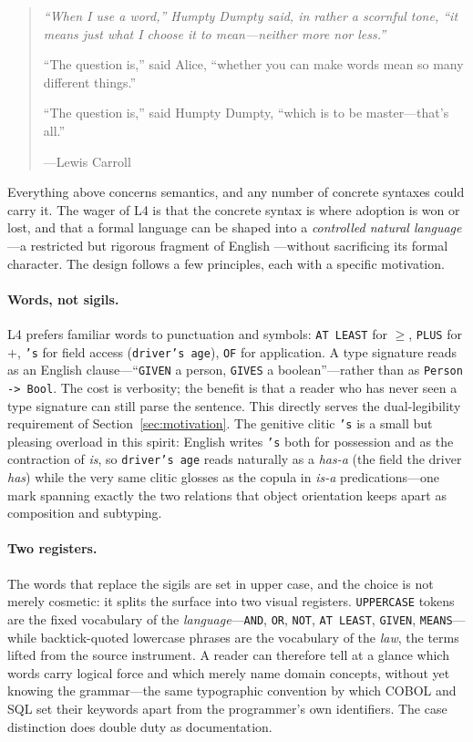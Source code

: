 \documentclass[sigconf,nonacm]{acmart}
\newcommand{\bq}{\char96\relax}            %
\newcommand{\code}[1]{\texttt{\small #1}}
\begin{document}
\begin{quote}\small\itshape
``When I use a word,'' Humpty Dumpty said, in rather a scornful tone, ``it means
just what I choose it to mean---neither more nor less.''

``The question is,'' said Alice, ``whether you can make words mean so many
different things.''

``The question is,'' said Humpty Dumpty, ``which is to be master---that's all.''
\par\upshape\hfill---Lewis Carroll \cite{carroll1871looking}
\end{quote}

Everything above concerns semantics, and any number of concrete syntaxes
could carry it. The wager of L4 is that the concrete syntax is where
adoption is won or lost, and that a formal language can be shaped into a
\emph{controlled natural language}---a restricted but rigorous fragment of
English \cite{kuhn2014cnl}---without sacrificing its formal character. The
design follows a few principles, each with a specific motivation.

\paragraph{Words, not sigils.}
L4 prefers familiar words to punctuation and symbols: \code{AT LEAST} for
$\geq$, \code{PLUS} for $+$, \code{'s} for field access (\code{driver's
age}), \code{OF} for application. A type signature reads as an English
clause---``\code{GIVEN} a person, \code{GIVES} a boolean''---rather than as
\code{Person -> Bool}. The cost is verbosity; the benefit is that a reader
who has never seen a type signature can still parse the sentence. This
directly serves the dual-legibility requirement of
Section~\ref{sec:motivation}. The genitive clitic \code{'s} is a small but
pleasing overload in this spirit: English writes \code{'s} both for
possession and as the contraction of \emph{is}, so \code{driver's age} reads
naturally as a \emph{has-a} (the field the driver \emph{has}) while the very
same clitic glosses as the copula in \emph{is-a} predications---one mark
spanning exactly the two relations that object orientation keeps apart as
composition and subtyping.

\paragraph{Two registers.}
The words that replace the sigils are set in upper case, and the choice is not
merely cosmetic: it splits the surface into two visual registers. \code{UPPERCASE}
tokens are the fixed vocabulary of the \emph{language}---\code{AND}, \code{OR},
\code{NOT}, \code{AT LEAST}, \code{GIVEN}, \code{MEANS}---while
\bq backtick-quoted lowercase phrases\bq{} are the vocabulary of the \emph{law},
the terms lifted from the source instrument. A reader can therefore tell at a
glance which words carry logical force and which merely name domain concepts,
without yet knowing the grammar---the same typographic convention by which COBOL
and SQL set their keywords apart from the programmer's own identifiers. The case
distinction does double duty as documentation.
\end{document}
